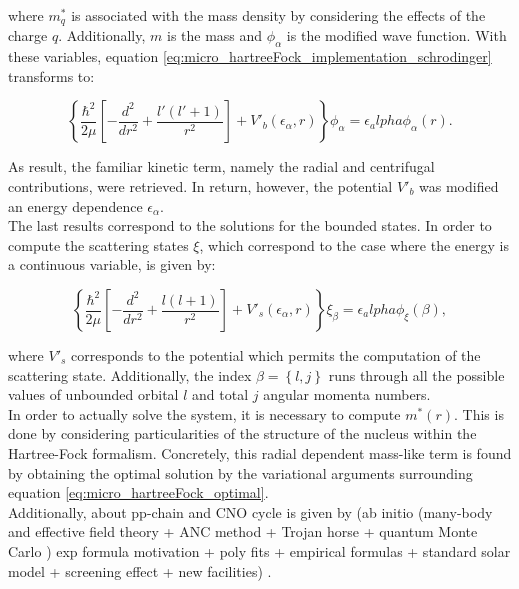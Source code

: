 \documentclass[openany]{book}
\begin{document}
where $m^{*}_q$ is associated with the mass density by considering the effects of the charge $q$. Additionally, $m$ is the mass and $\phi_\alpha$ is the modified wave function. With these variables, equation \ref{eq:micro_hartreeFock_implementation_schrodinger} transforms to:

\begin{equation}\label{eq:micro_hartreeFock_implementation_schrodinger_modified}
	\left \{ \frac{\hbar^2}{2\mu} \left [ - \frac{d^2}{dr^2} + \frac{l'(l'+1)}{r^2} \right] + V'_b(\epsilon_\alpha, r) \right \} \phi_\alpha = \epsilon_alpha \phi_\alpha(r).
\end{equation}

As result, the familiar kinetic term, namely the radial and centrifugal contributions, were retrieved. In return, however, the potential $V'_b$ was modified an energy dependence $\epsilon_\alpha$. \\

The last results correspond to the solutions for the bounded states. In order to compute the scattering states $\xi$, which correspond to the case where the energy is a continuous variable, is given by: 

\begin{equation}\label{eq:micro_hartreeFock_implementation_schrodinger_scattered}
	\left \{ \frac{\hbar^2}{2\mu} \left [ - \frac{d^2}{dr^2} + \frac{l(l+1)}{r^2} \right] + V'_s(\epsilon_\alpha, r) \right \} \xi_\beta = \epsilon_alpha \phi_\xi(\beta),
\end{equation}

where $V'_s$ corresponds to the potential which permits the computation of the scattering state. Additionally, the index $\beta = \left \{ l, j\right \}$ runs through all the possible values of unbounded orbital $l$ and total $j$ angular momenta numbers. \\

In order to actually solve the system, it is necessary to compute $m^{*}(r)$. This is done by considering particularities of the structure of the nucleus within the Hartree-Fock formalism. Concretely, this radial dependent mass-like term is found by obtaining the optimal solution by the variational arguments surrounding equation \ref{eq:micro_hartreeFock_optimal}. \\


Additionally, about pp-chain and CNO cycle  is given by (ab initio (many-body and effective field theory + ANC method + Trojan horse + quantum Monte Carlo ) exp formula motivation + poly fits + empirical formulas +   standard solar model + screening effect + new facilities) \cite{adelberger_garcia_robertson_snover_balantekin_heeger_ramsey-musolf_bemmerer_junghans_bertulani_et_2011}. \\
\end{document}
